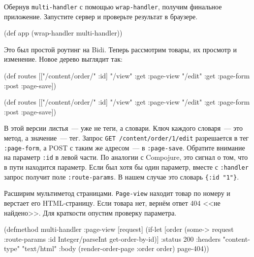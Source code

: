 Обернув \verb|multi-handler| с помощью \texttt{wrap\--hand\-ler}, получим
финальное приложение. Запустите сервер и проверьте результат в браузере.

\begin{english}
  \begin{clojure}
(def app (wrap-handler multi-handler))
  \end{clojure}
\end{english}

Это был простой роутинг на Bidi. Теперь рассмотрим товары, их
просмотр и изменение. Новое дерево выглядит так:

\ifnarrow

\begin{english}
  \begin{clojure}
(def routes
  [["/content/order/" :id]
   {"/view" {:get  :page-view}
    "/edit" {:get  :page-form
             :post :page-save}}])
  \end{clojure}
\end{english}

\else

\begin{english}
  \begin{clojure}
(def routes
  [["/content/order/" :id] {"/view" {:get  :page-view}
                            "/edit" {:get  :page-form
                                     :post :page-save}}])
  \end{clojure}
\end{english}

\fi

В этой версии листья~--- уже не теги, а словари. Ключ каждого
словаря~--- это метод, а значение~--- тег. Запрос \texttt{GET /content/\-order/1/\-edit}
разрешается в тег \verb|:page-form|, а POST с таким же адресом~--- в
\verb|:page-save|. Обратите внимание на параметр \verb|:id| в левой части. По
аналогии с Compojure, это сигнал о том, что в пути находится параметр. Если был
хотя бы один параметр, вместе с \texttt{:handler} запрос получит поле
\texttt{:route-params}. В нашем случае это словарь \verb|{:id "1"}|.


Расширим мультиметод страницами. \verb|Page-view| находит товар по
номеру и верстает его HTML-страницу. Если товара нет, вернём ответ 404 <<не
найдено>>. Для краткости опустим проверку параметра.

\ifnarrow

\begin{english}
  \begin{clojure}
(defmethod multi-handler :page-view
  [request]
  (if-let [order (some->
                   request
                   :route-params
                   :id
                   Integer/parseInt
                   get-order-by-id)]
    {:status 200
     :headers {"content-type"
               "text/html"}
     :body (render-order-page
             {:order order})}
    page-404))
  \end{clojure}
\end{english}

